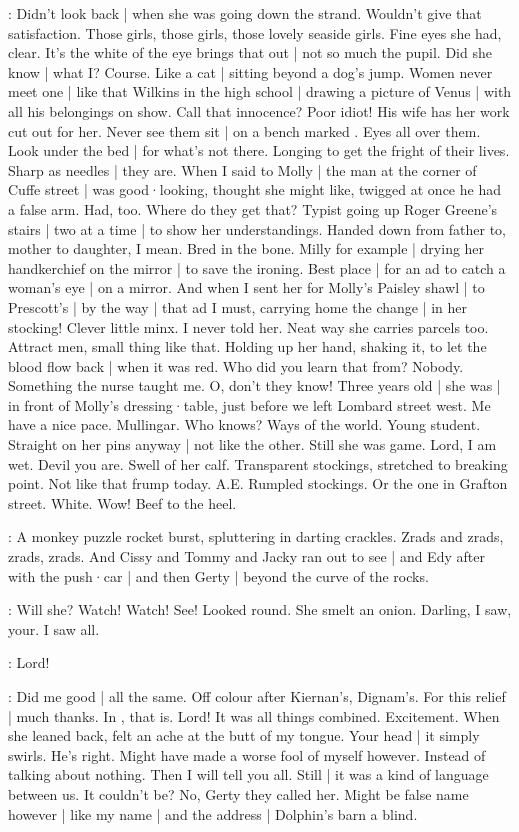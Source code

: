 \Bloom:
Didn't look back |
when she was going down the strand.
Wouldn't give that satisfaction.
Those girls,
those girls,
those lovely seaside girls.
Fine eyes she had,
clear.
It's the white of the eye brings that out |
not so much the pupil.
Did she know |
what I?
Course.
Like a cat |
sitting beyond a dog's jump.
Women never meet one |
like that Wilkins in the high school |
drawing a picture of Venus |
with all his belongings on show.%
Call that innocence?
Poor idiot!
His wife has her work cut out for her.
Never see them sit |
on a bench marked .
Eyes all over them.
Look under the bed |
for what's not there.
Longing to get the fright of their lives.
Sharp as needles |
they are.
When I said to Molly |
the man at the corner of Cuffe street |
was good·looking,
thought she might like,
twigged at once
he had a false arm.
Had,
too.
Where do they get that?
Typist going up Roger Greene's stairs |
two at a time |
to show her understandings.
Handed down from father to,
mother to daughter,
I mean.
Bred in the bone.
Milly for example |
drying her handkerchief
on the mirror |
to save the ironing.
Best place |
for an ad to catch a woman's eye |
on a mirror.%
And when I sent her
for Molly's Paisley shawl |
to Prescott's |
by the way |
that ad I must,
carrying home the change |
in her stocking!
Clever little minx.
I never told her.
Neat way she carries parcels too.
Attract men,
small thing like that.
Holding up her hand,
shaking it,
to let the blood flow back |
when it was red.
Who did you learn that from?
Nobody.
Something the nurse taught me.
O,
don't they know!
Three years old |
she was |
in front of Molly's dressing·table,
just before we left Lombard street west.
Me have a nice pace.
Mullingar.
Who knows?
Ways of the world.
Young student.
Straight on her pins anyway |
not like the other.
Still she was game.
Lord,
I am wet.
Devil you are.
Swell of her calf.
Transparent stockings,
stretched to breaking point.%
Not like that frump today.
A.E.
Rumpled stockings.
Or the one in Grafton street.
White.
Wow!
Beef to the heel.

:
A monkey puzzle rocket burst,
spluttering in darting crackles.
Zrads and zrads,
zrads,
zrads.
And Cissy and Tommy and Jacky ran out to see |
and Edy after with the push·car |
and then Gerty |
beyond the curve of the rocks.

\Bloom:
Will she?
Watch!
Watch!
See!
Looked round.
She smelt an onion.
Darling,
I saw,
your.
I saw all.

\Bloom:
Lord!

\Bloom:
Did me good |
all the same.
Off colour after Kiernan's,
Dignam's.
For this relief |
much thanks.
In ,
that is.%
Lord!
It was all things combined.
Excitement.
When she leaned back,
felt an ache at the butt of my tongue.
Your head |
it simply swirls.
He's right.
Might have made a worse fool of myself however.
Instead of talking about nothing.
Then I will tell you all.
Still |
it was a kind of language between us.
It couldn't be?
No,
Gerty they called her.
Might be false name however |
like my name |
and the address |
Dolphin's barn a blind.


